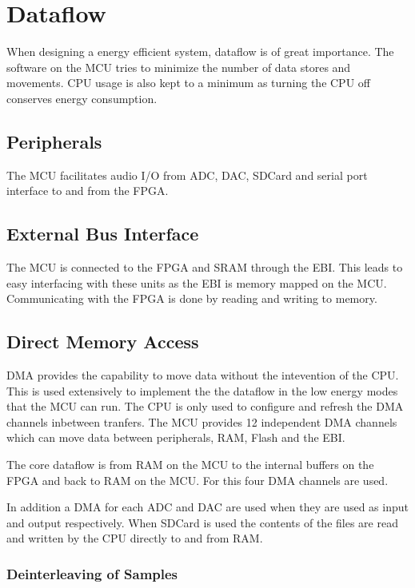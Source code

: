 \section{Dataflow}

When designing a energy efficient system, dataflow is of great importance. The software 
on the MCU tries to minimize the number of data stores and movements. CPU usage is also
kept to a minimum as turning the CPU off conserves energy consumption.

\subsection{Peripherals}
The MCU facilitates audio I/O from ADC, DAC, SDCard and serial port interface to and from 
the FPGA. 


\subsection{External Bus Interface}
The MCU is connected to the FPGA and SRAM through the EBI. This leads to easy interfacing 
with these units as the EBI is memory mapped on the MCU. Communicating with the FPGA is 
done by reading and writing to memory. 


\subsection{Direct Memory Access}
DMA provides the capability to move data without the intevention of the CPU. 
This is used extensively to implement the the dataflow in the low energy modes
that the MCU can run. The CPU is only used to configure and refresh the DMA 
channels inbetween tranfers. The MCU provides 12 independent DMA channels which can
move data between peripherals, RAM, Flash and the EBI. 

The core dataflow is from RAM on the MCU to the internal buffers on the FPGA 
and back to RAM on the MCU. For this four DMA channels are used.

In addition a DMA for each ADC and DAC are used when they are used as input and 
output respectively. When SDCard is used the contents of the files are read and
written by the CPU directly to and from RAM. 

\subsubsection{Deinterleaving of Samples}

